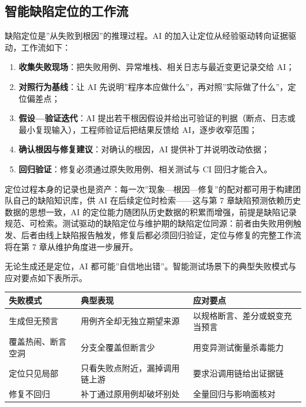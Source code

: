 \documentclass[
]{ctexbook}
\providecommand{\tightlist}{\setlength{\itemsep}{0pt}\setlength{\parskip}{0pt} }
\newcounter{none}
\begin{document}
\subsection{智能缺陷定位的工作流}\label{ux667aux80fdux7f3aux9677ux5b9aux4f4dux7684ux5de5ux4f5cux6d41}

缺陷定位是''从失败到根因''的推理过程。AI
的加入让定位从经验驱动转向证据驱动，工作流如下：

\begin{enumerate}
\def\labelenumi{\arabic{enumi}.}
\tightlist
\item
  \textbf{收集失败现场}：把失败用例、异常堆栈、相关日志与最近变更记录交给
  AI；
\item
  \textbf{对照行为基线}：让 AI
  先说明''程序本应做什么''，再对照''实际做了什么''，定位偏差点；
\item
  \textbf{假设---验证迭代}：AI
  提出若干根因假设并给出可验证的判据（断点、日志或最小复现输入），工程师验证后把结果反馈给
  AI，逐步收窄范围；
\item
  \textbf{确认根因与修复建议}：对确认的根因，AI 提供补丁并说明改动依据；
\item
  \textbf{回归验证}：修复必须通过原失败用例、相关测试与 CI
  回归才能合入。
\end{enumerate}

定位过程本身的记录也是资产：每一次''现象---根因---修复''的配对都可用于构建团队自己的缺陷知识库，供
AI 在后续定位时检索------这与第 7 章缺陷预测依赖历史数据的思想一致，AI
的定位能力随团队历史数据的积累而增强，前提是缺陷记录规范、可检索。测试驱动的缺陷定位与维护期的缺陷定位同源：前者由失败用例触发、后者由线上缺陷报告触发，修复后都必须回归验证，定位与修复的完整工作流将在第
7 章从维护角度进一步展开。

无论生成还是定位，AI
都可能''自信地出错''。智能测试场景下的典型失败模式与应对要点如下表所示。

{\def\LTcaptype{none} %
\begin{longtable}[]{@{}
  >{\raggedright\arraybackslash}p{}
  >{\raggedright\arraybackslash}p{}
  >{\raggedright\arraybackslash}p{}@{}}
\toprule\noalign{}
\begin{minipage}[b]{\linewidth}\raggedright
失败模式
\end{minipage} & \begin{minipage}[b]{\linewidth}\raggedright
典型表现
\end{minipage} & \begin{minipage}[b]{\linewidth}\raggedright
应对要点
\end{minipage} \\
\midrule\noalign{}
\endhead
\bottomrule\noalign{}
\endlastfoot
生成但无预言 & 用例齐全却无独立期望来源 &
以规格断言、差分或蜕变充当预言 \\
覆盖热闹、断言空洞 & 分支全覆盖但断言少 & 用变异测试衡量杀毒能力 \\
定位只见局部 & 只看失败点附近，漏掉调用链上游 &
要求沿调用链给出证据链 \\
修复不回归 & 补丁通过原用例却破坏别处 & 全量回归与影响面核对 \\
\end{longtable}
}
\end{document}
